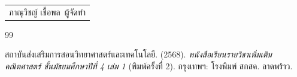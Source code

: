 \documentclass[a4paper,oneside,12pt]{book}
\begin{document}
\vspace{1.5cm}

\begin{flushright}
	\begin{tabular}{c}
		ภาณุวิชญ์ เชื้อพล\
		ผู้จัดทำ
	\end{tabular}
\end{flushright}


	\frontmatter
	\tableofcontents
	\clearpage
	
	\mainmatter
		

\clearpage


\begingroup

\setcounter{chapter}{0}

\renewcommand{\bibname}{บรรณานุกรม}

\begin{thebibliography}{99}
	
สถาบันส่งเสริมการสอนวิทยาศาสตร์และเทคโนโลยี. (2568).
\textit{หนังสือเรียนรายวิชาเพิ่มเติมคณิตศาสตร์ ชั้นมัธยมศึกษาปีที่ 4 เล่ม 1} (พิมพ์ครั้งที่ 2).
กรุงเทพฯ: โรงพิมพ์ สกสค. ลาดพร้าว.
	
\end{thebibliography}

\endgroup			
\end{document}
